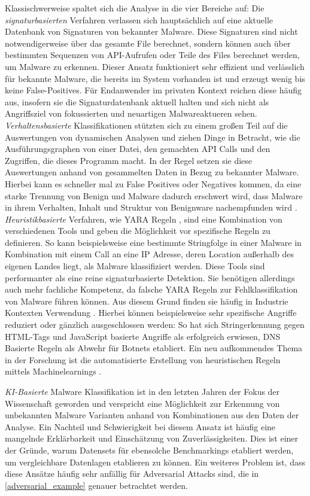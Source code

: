 Klassischwerweise spaltet sich die Analyse in die vier Bereiche auf: 
Die \textit{signaturbasierten} Verfahren verlassen sich hauptsächlich auf eine aktuelle Datenbank von Signaturen von bekannter Malware. Diese Signaturen sind nicht notwendigerweise über das gesamte File berechnet, sondern können auch über bestimmten Sequenzen von API-Aufrufen oder Teile des Files berechnet werden, um Malware zu erkennen. Dieser Ansatz funktioniert sehr effizient und verlässlich für bekannte Malware, die bereits im System vorhanden ist und erzeugt wenig bis keine False-Positives. Für Endanwender im privaten Kontext reichen diese häufig aus, insofern sie die Signaturdatenbank aktuell halten und sich nicht als Angriffsziel von fokussierten und neuartigen Malwareaktueren sehen. 
\textit{Verhaltensbasierte} Klassifikationen stützten sich zu einem großen Teil auf die Auswertungen von dynamischen Analysen und ziehen Dinge in Betracht, wie die Ausführungsgraphen von einer Datei, den gemachten API Calls und den Zugriffen, die dieses Programm macht. In der Regel setzen sie diese Auswertungen anhand von gesammelten Daten in Bezug zu bekannter Malware. Hierbei kann es schneller mal zu False Positives oder Negatives kommen, da eine starke Trennung von Benign und Malware dadurch erschwert wird, dass Malware in ihrem Verhalten, Inhalt und Struktur von Benignware nachempfunden wird \cite{rathore_2023_breaking} .
\textit{Heuristikbasierte} Verfahren, wie YARA Regeln \cite{yara}, sind eine Kombination von verschiedenen Tools und geben die Möglichkeit vor spezifische Regeln zu definieren. So kann beispielsweise eine bestimmte Stringfolge in einer Malware in Kombination mit einem Call an eine IP Adresse, deren Location außerhalb des eigenen Landes liegt, als Malware klassifiziert werden. Diese Tools sind performanter als eine reine signaturbasierte Detektion. Sie benötigen allerdings auch mehr fachliche Kompetenz, da falsche YARA Regeln zur Fehlklassifikation von Malware führen können. Aus diesem Grund finden sie häufig in Industrie Kontexten Verwendung \cite{lockett_2021_assessing,yara}. Hierbei können beispielsweise sehr spezifische Angriffe reduziert oder gänzlich ausgeschlossen werden: So hat sich Stringerkennung gegen HTML-Tags und JavaScript basierte Angriffe als erfolgreich erwiesen, DNS Basierte Regeln als Abwehr für Botnets etabliert. Ein neu aufkommendes Thema in der Forschung ist die automatisierte Erstellung von heuristischen Regeln mittels Machinelearnings \cite{li_2024_automatically}.

\textit{KI-Basierte} Malware Klassifikation ist in den letzten Jahren der Fokus der Wissenschaft geworden \cite{fatemehdeldar_2023_deep, pascalmaniriho_2023_apimaldetect} und verspricht eine Möglichkeit zur Erkennung von unbekannten Malware Varianten anhand von Kombinationen aus den Daten der Analyse. Ein Nachteil und Schwierigkeit bei diesem Ansatz ist häufig eine mangelnde Erklärbarkeit und Einschätzung von Zuverlässigkeiten. Dies ist einer der Gründe, warum \cite{jiang_2024_benchmfc} Datensets für ebensolche Benchmarkings etabliert werden, um vergleichbare Datenlagen etablieren zu können. Ein weiteres Problem ist, dass diese Ansätze häufig sehr anfällig für Adversarial  Attacks sind, die in \ref{adversarial_example} genauer betrachtet werden.